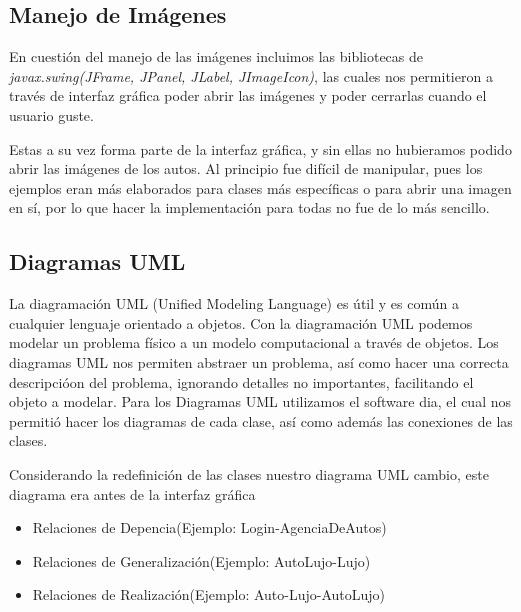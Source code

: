 \documentclass{article}
\begin{document}
\subsection{Manejo de Imágenes}

En cuestión del manejo de las imágenes incluimos las bibliotecas de \textit{javax.swing(JFrame, JPanel, JLabel, JImageIcon)}, las cuales nos permitieron a través de interfaz gráfica
 poder abrir las imágenes y poder cerrarlas cuando el usuario guste.\newline

Estas a su vez forma parte de la interfaz gráfica, y sin ellas no hubieramos podido abrir las imágenes de los autos. Al principio fue difícil de manipular, pues los ejemplos eran
más elaborados para clases más específicas o para abrir una imagen en sí, por lo que hacer la implementación para todas no fue de lo más sencillo.
\subsection{Diagramas UML}

La diagramación UML (Unified Modeling Language) es útil y es común a cualquier lenguaje orientado a objetos. Con la diagramación UML podemos modelar un problema físico a un modelo computacional a través de objetos. 
Los diagramas UML nos permiten abstraer un problema, así como hacer una correcta descripcióon del problema, ignorando detalles no importantes, facilitando el objeto a modelar.
Para los Diagramas UML utilizamos el software dia, el cual nos permitió hacer los diagramas de cada clase, así como además las conexiones de las clases.\newline

Considerando la redefinición de las clases nuestro diagrama UML cambio, este  diagrama era antes de la interfaz gráfica


\begin{itemize}
\item Relaciones de Depencia(Ejemplo: Login-AgenciaDeAutos)
\item Relaciones de Generalización(Ejemplo: AutoLujo-Lujo)
\item Relaciones de Realización(Ejemplo: Auto-Lujo-AutoLujo)
\end{itemize}
\end{document}
